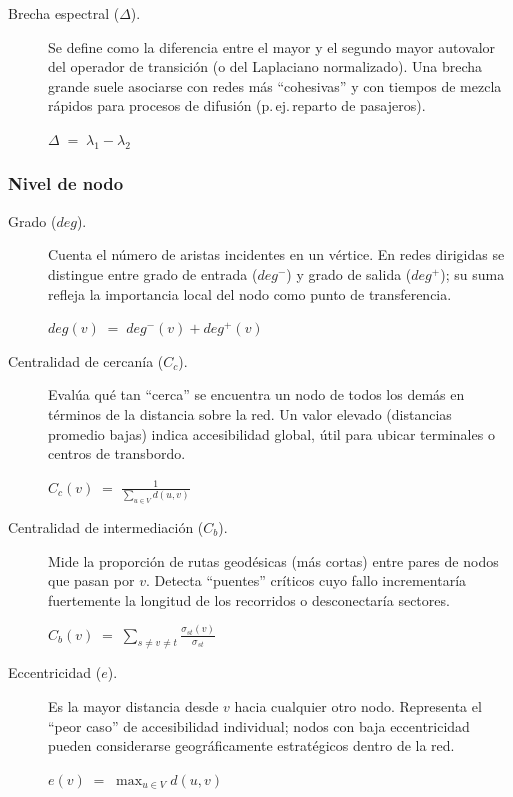 \documentclass[openany]{book}
\begin{document}
\begin{description}
		\item[Brecha espectral ($\Delta$).]
		Se define como la diferencia entre el mayor y el segundo mayor autovalor del operador de transición (o del Laplaciano normalizado). Una brecha grande suele asociarse con redes más “cohesivas” y con tiempos de mezcla rápidos para procesos de difusión (p.\,ej.\,reparto de pasajeros).
		\begin{center}
		$\displaystyle \Delta \;=\; \lambda_{1} - \lambda_{2}$
		\end{center}

		\end{description}

		\subsubsection*{Nivel de nodo}

		\begin{description}

		\item[Grado ($deg$).]
		Cuenta el número de aristas incidentes en un vértice. En redes dirigidas se distingue entre grado de entrada ($deg^{-}$) y grado de salida ($deg^{+}$); su suma refleja la importancia local del nodo como punto de transferencia.
		\begin{center}
		$\displaystyle deg(v) \;=\; deg^{-}(v) + deg^{+}(v)$
		\end{center}

		\item[Centralidad de cercanía ($C_c$).]
		Evalúa qué tan “cerca” se encuentra un nodo de todos los demás en términos de la distancia sobre la red. Un valor elevado (distancias promedio bajas) indica accesibilidad global, útil para ubicar terminales o centros de transbordo.
		\begin{center}
		$\displaystyle C_c(v) \;=\; \frac{1}{\sum_{u\in V} d(u,v)}$
		\end{center}

		\item[Centralidad de intermediación ($C_b$).]
		Mide la proporción de rutas geodésicas (más cortas) entre pares de nodos que pasan por $v$. Detecta “puentes” críticos cuyo fallo incrementaría fuertemente la longitud de los recorridos o desconectaría sectores.
		\begin{center}
		$\displaystyle C_b(v) \;=\; \sum_{s\neq v\neq t}\frac{\sigma_{st}(v)}{\sigma_{st}}$
		\end{center}

		\item[Eccentricidad ($e$).]
		Es la mayor distancia desde $v$ hacia cualquier otro nodo. Representa el “peor caso” de accesibilidad individual; nodos con baja eccentricidad pueden considerarse geográficamente estratégicos dentro de la red.
		\begin{center}
		$\displaystyle e(v) \;=\; \max_{u\in V} d(u,v)$
		\end{center}

		\end{description}
\end{document}
